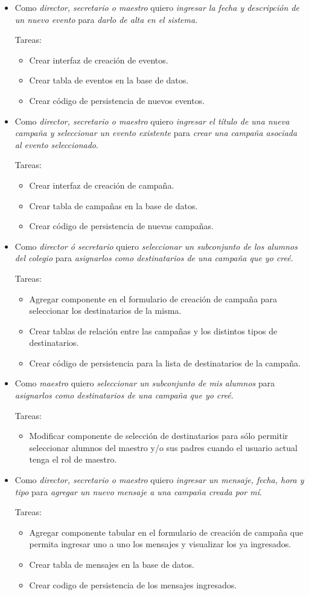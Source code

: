\documentclass[a4paper, 10pt, twoside]{article}
\newenvironment{stories}{
  \begin{itemize}
}{
  \end{itemize}
}
\newcommand{\story}[3]{
  \item
  Como \emph{#1} quiero \emph{#2} para \emph{#3}.
}
\newenvironment{tasks}{
  Tareas:
  \begin{itemize}
}{
  \end{itemize}
}
\newcommand{\task}[1] {
  \item #1.
}
\begin{document}
\begin{stories}
  \story{director, secretario o maestro}
        {ingresar la fecha y descripción de un nuevo evento}
        {darlo de alta en el sistema}

  \begin{tasks}
    \task{Crear interfaz de creación de eventos}
    \task{Crear tabla de eventos en la base de datos}
    \task{Crear código de persistencia de nuevos eventos}
  \end{tasks}

  \story{director, secretario o maestro}
        {ingresar el título de una nueva campaña y seleccionar un evento existente}
        {crear una campaña asociada al evento seleccionado}

  \begin{tasks}
    \task{Crear interfaz de creación de campaña}
    \task{Crear tabla de campañas en la base de datos}
    \task{Crear código de persistencia de nuevas campañas}
  \end{tasks}

  \story{director ó secretario}
        {seleccionar un subconjunto de los alumnos del colegio}
        {asignarlos como destinatarios de una campaña que yo creé}

  \begin{tasks}
    \task{Agregar componente en el formulario de creación de campaña para seleccionar los destinatarios de la misma}
    \task{Crear tablas de relación entre las campañas y los distintos tipos de destinatarios}
    \task{Crear código de persistencia para la lista de destinatarios de la campaña}
  \end{tasks}

  \story{maestro}
        {seleccionar un subconjunto de mis alumnos}
        {asignarlos como destinatarios de una campaña que yo creé}

  \begin{tasks}
    \task{Modificar componente de selección de destinatarios para sólo permitir seleccionar alumnos del maestro y/o sus padres cuando el usuario actual tenga el rol de maestro}
  \end{tasks}

  \story{director, secretario o maestro}
        {ingresar un mensaje, fecha, hora y tipo}
        {agregar un nuevo mensaje a una campaña creada por mí}

  \begin{tasks}
    \task{Agregar componente tabular en el formulario de creación de campaña que permita ingresar uno a uno los mensajes y visualizar los ya ingresados}
    \task{Crear tabla de mensajes en la base de datos}
    \task{Crear codigo de persistencia de los mensajes ingresados}
  \end{tasks}


\end{stories}
\end{document}
